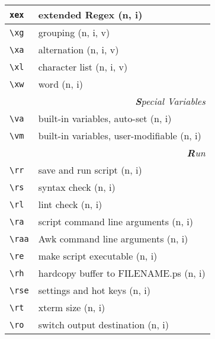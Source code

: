 \documentclass[oneside,10pt,landscape,DIV17]{scrartcl}
\begin{document}
\begin{multicols}{3}
\begin{center}
\begin{tabular}[]{|p{11mm}|p{62mm}|}
\hline     \verb'xex' &  extended Regex                \hfill (n, i)\\ 
\hline     \verb'\xg' &  grouping                      \hfill (n, i, v)   \\
\hline     \verb'\xa' &  alternation                   \hfill (n, i, v)   \\
\hline     \verb'\xl' &  character list                \hfill (n, i, v)   \\
\hline     \verb'\xw' &  word                          \hfill (n, i)   \\
\hline
\hline
\multicolumn{2}{|r|}{\textsl{\textbf{S}pecial Variables}}            \\[1.0ex]
\hline \verb'\va'   & built-in variables, auto-set        \hfill (n, i)\\
\hline \verb'\vm'   & built-in variables, user-modifiable \hfill (n, i)\\
\hline
\hline
\multicolumn{2}{|r|}{\textsl{\textbf{R}un}} \\[1.0ex]
\hline \verb'\rr '  & save and run script                 \hfill (n, i)   \\
\hline \verb'\rs '  & syntax check                        \hfill (n, i)   \\
\hline \verb'\rl '  & lint check                          \hfill (n, i)   \\
\hline \verb'\ra '  & script command line arguments       \hfill (n, i)   \\
\hline \verb'\raa'  & Awk command line arguments          \hfill (n, i)   \\
\hline \verb'\re '  & make script executable              \hfill (n, i)   \\
\hline \verb'\rh '  & hardcopy buffer to FILENAME.ps      \hfill (n, i)   \\
\hline \verb'\rse'  & settings and hot keys               \hfill (n, i)   \\
\hline \verb'\rt '  & xterm size                          \hfill (n, i)   \\
\hline \verb'\ro '  & switch output destination           \hfill (n, i)   \\
\hline
\end{tabular}\\

\end{center}
\end{multicols}
\end{document}
